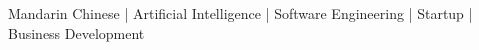
\begin{cvinterests}
    {Mandarin Chinese | Artificial Intelligence | Software Engineering | Startup | Business Development}
\end{cvinterests}